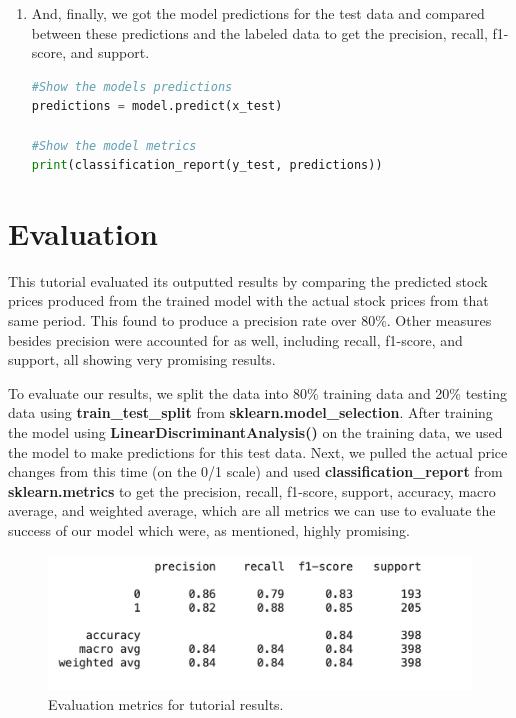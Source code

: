 \documentclass[10pt,twocolumn]{article}
\begin{document}
\begin{enumerate}
    \item And, finally, we got the model predictions for the test data and compared between these predictions and the labeled data to get the precision, recall, f1-score, and support.

\begin{lstlisting}[language=Python, caption=Get predictions and evaluate]
#Show the models predictions
predictions = model.predict(x_test)

#Show the model metrics
print(classification_report(y_test, predictions))
\end{lstlisting}

\end{enumerate}


\section{Evaluation}

This tutorial evaluated its outputted results by comparing the predicted stock prices produced from the trained model with the actual stock prices from that same period. This found to produce a precision rate over 80\%. Other measures besides precision were accounted for as well, including recall, f1-score, and support, all showing very promising results.

To evaluate our results, we split the data into 80\% training data and 20\% testing data using \textbf{train\_test\_split} from \textbf{sklearn.model\_selection}. After training the model using \textbf{LinearDiscriminantAnalysis()} on the training data, we used the model to make predictions for this test data. Next, we pulled the actual price changes from this time (on the 0/1 scale) and used \textbf{classification\_report} from \textbf{sklearn.metrics} to get the precision, recall, f1-score, support, accuracy, macro average, and weighted average, which are all metrics we can use to evaluate the success of our model which were, as mentioned, highly promising.

\begin{figure}
    \centering
    \includegraphics[scale=0.50]{images/evaluation_results.png}
    \caption{
        Evaluation metrics for tutorial results.
    }
\end{figure}
\end{document}
